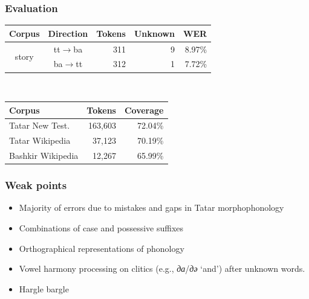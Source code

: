 \documentclass[10pt,xetex]{beamer} %
\begin{document}
\begin{frame}
  \frametitle{Evaluation}

\begin{center}
  \begin{tabular}{ccrrr}
  \hline
   Corpus                 & Direction         & Tokens  & Unknown & WER  \\
  \hline
   \multirow{2}{*}{story} & tt$\rightarrow$ba & 311     & 9  & 8.97\% \\
                          & ba$\rightarrow$tt & 312     & 1  & 7.72\%  \\
  \hline
  \end{tabular}

~\\

  \begin{tabular}{lrr}
  \hline
   Corpus                  & Tokens    & Coverage\\
  \hline
   Tatar New Test.         & 163,603   & 72.04\% \\
   Tatar Wikipedia         & 37,123    & 70.19\% \\
  \hline
   Bashkir Wikipedia       & 12,267    & 65.99\% \\
  \hline
  \end{tabular}

\end{center}

\end{frame}

\begin{frame}
  \frametitle{Weak points}

\begin{itemize}
  \item Majority of errors due to mistakes and gaps in Tatar morphophonology
  \item Combinations of case and possessive suffixes
  \item Orthographical representations of phonology
  \item Vowel harmony processing on clitics (e.g., \emph{да}/\emph{дә} `and')  
     after unknown words.
  \item Hargle bargle
\end{itemize}

\end{frame}
\end{document}
